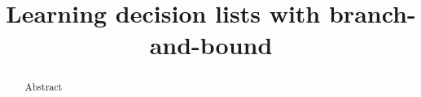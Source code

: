 \documentclass[aoas,preprint]{imsart}
\begin{document}
\begin{frontmatter}

\title{Learning decision lists with branch-and-bound}


\begin{abstract}
Abstract
\end{abstract}

\end{frontmatter}


\end{document}
